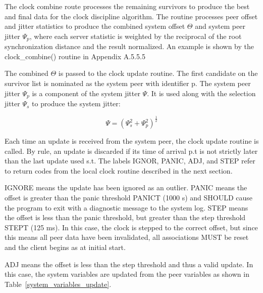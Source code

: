 The clock combine route processes the remaining survivors to produce
the best and final data for the clock discipline algorithm. The
routine processes peer offset and jitter statistics to produce the
combined system offset $ \Theta $ and system peer jitter $ \Psi_p $, where each
server statistic is weighted by the reciprocal of the root
synchronization distance and the result normalized. An example is
shown by the clock\_combine() routine in Appendix A.5.5.5

The combined $ \Theta $ is passed to the clock update routine. The first
candidate on the survivor list is nominated as the system peer with
identifier p. The system peer jitter $ \Psi_p $ is a component of the
system jitter $ \Psi $. It is used along with the selection jitter $ \Psi_s $
to produce the system jitter:

$$
\Psi = \left( \Psi_s^2 + \Psi_p^2 \right)^{\frac{1}{2}}
$$

Each time an update is received from the system peer, the clock
update routine is called. By rule, an update is discarded if its
time of arrival p.t is not strictly later than the last update used
s.t. The labels IGNOR, PANIC, ADJ, and STEP refer to return codes
from the local clock routine described in the next section.

IGNORE means the update has been ignored as an outlier. PANIC means
the offset is greater than the panic threshold PANICT (1000 s) and
SHOULD cause the program to exit with a diagnostic message to the
system log. STEP means the offset is less than the panic threshold,
but greater than the step threshold STEPT (125 ms). In this case,
the clock is stepped to the correct offset, but since this means all
peer data have been invalidated, all associations MUST be reset and
the client begins as at initial start.

ADJ means the offset is less than the step threshold and thus a valid
update. In this case, the system variables are updated from the peer
variables as shown in Table~\ref{system_variables_update}.

